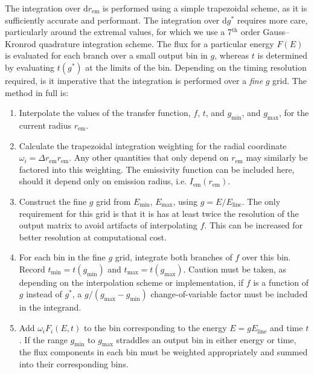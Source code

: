 \documentclass[fleqn,usenatbib]{mnras}
\renewcommand{\d}{\text{d}}
\newcommand{\rhoem}{r_\text{em}}
\begin{document}
The integration over $\d \rhoem$ is performed using a simple trapezoidal scheme,
as it is sufficiently accurate and performant. The integration over $\d g^\ast$
requires more care, particularly around the extremal values, for which we use a
7$^\text{th}$ order Gauss--Kronrod quadrature integration scheme. The flux for a
particular energy $F(E)$ is evaluated for each branch over a small output bin in
$g$, whereas $t$ is determined by evaluating $t(g^\ast)$ at the limits of the
bin. Depending on the timing resolution required, is it imperative that the
integration is performed over a \emph{fine} $g$ grid. The method in full is:
\begin{enumerate}
    \item Interpolate the values of the transfer function, $f$, $t$, and
        $g_\text{min}$, and $g_\text{max}$, for the current radius $\rhoem$.
    \item Calculate the trapezoidal integration weighting for the radial
        coordinate $\omega_i = \Delta \rhoem \rhoem$. Any other quantities that only
        depend on $\rhoem$ may similarly be factored into this weighting. The
        emissivity function can be included here, should it depend only on
        emission radius, i.e. $I_\text{em}(\rhoem)$.
    \item Construct the fine $g$ grid from $E_\text{min}$, $E_\text{max}$, using
        $g = E / E_\text{line}$. The only requirement for this grid is that it
        is has at least twice the resolution of the output matrix to avoid
        artifacts of interpolating $f$. This can be increased for better
        resolution at computational cost.
    \item For each bin in the fine $g$ grid, integrate both branches of $f$ over
        this bin. Record $t_\text{min} = t(g_\text{min})$ and $t_\text{max} =
        t(g_\text{max})$. Caution must be taken, as depending on the
        interpolation scheme or implementation, if $f$ is a function of $g$
        instead of $g^\ast$, a $g / (g_\text{max} - g_\text{min})$
        change-of-variable factor must be included in the integrand.
    \item Add $\omega_i F_i(E, t)$ to the bin corresponding to the energy $E =
        gE_\text{line}$ and time $t$. If the range $g_\text{min}$ to
        $g_\text{max}$ straddles an output bin in either energy or time, the
        flux components in each bin must be weighted appropriately and summed
        into their corresponding bins.
\end{enumerate}
\end{document}

